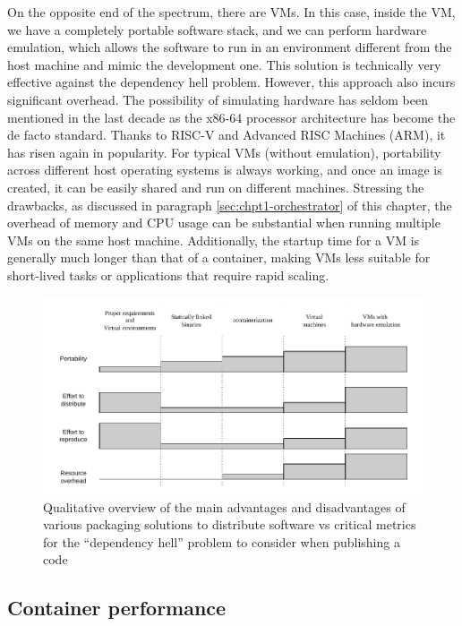 On the opposite end of the spectrum, there are VMs.
In this case, inside the VM, we have a completely portable software stack, and
we can perform hardware emulation, which allows the software to run in an
environment different from the host machine and mimic the development one.
This solution is technically very effective against the dependency hell problem.
However, this approach also incurs significant overhead.
The possibility of simulating hardware has seldom been mentioned in the last
decade as the x86-64 processor architecture has become the de facto standard.
Thanks to RISC-V and Advanced RISC Machines (ARM), it has risen again in
popularity.
For typical VMs (without emulation), portability across different host operating
systems is always working, and once an image is created, it can be easily shared
and run on different machines.
Stressing the drawbacks, as discussed in paragraph \ref{sec:chpt1-orchestrator}
of this chapter, the overhead of memory and CPU usage can be substantial when
running multiple VMs on the same host machine.
Additionally, the startup time for a VM is generally much longer than that of a
container, making VMs less suitable for short-lived tasks or applications that
require rapid scaling.

\begin{figure}%
    \centering
    \includegraphics[width=\textwidth]{img/chpt1/solutions-spectrum}
    \caption{Qualitative overview of the main advantages and disadvantages of
      various packaging solutions to distribute software vs critical metrics for
      the ``dependency hell'' problem to consider when publishing a code}
    \label{fig:solspectrum}
\end{figure}


\subsection{Container performance}

